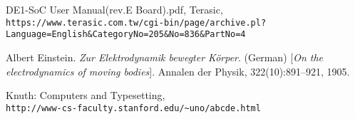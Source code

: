 \begin{thebibliography}{9}
DE1-SoC User Manual(rev.E Board).pdf, Terasic, \verb+https://www.terasic.com.tw/cgi-bin/page/archive.pl?Language=English&CategoryNo=205&No=836&PartNo=4 +
 
Albert Einstein. 
\textit{Zur Elektrodynamik bewegter K{\"o}rper}. (German) 
[\textit{On the electrodynamics of moving bodies}]. 
Annalen der Physik, 322(10):891–921, 1905.
 
Knuth: Computers and Typesetting,
\\\texttt{http://www-cs-faculty.stanford.edu/\~{}uno/abcde.html}
\end{thebibliography}
